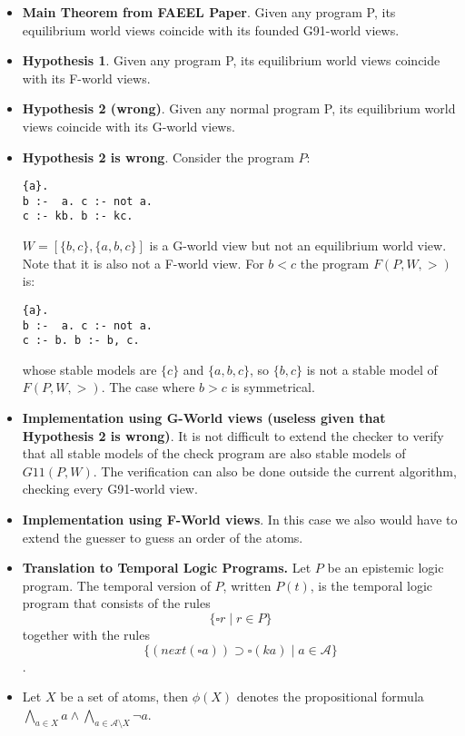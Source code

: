 \documentclass{article}
\begin{document}
\begin{itemize}
\item
\textbf{Main Theorem from FAEEL Paper}.
Given any program P, its equilibrium world views coincide
with its founded G91-world views.

\item
\textbf{Hypothesis 1}.
Given any program P, its equilibrium world views coincide
with its F-world views.

\item
\textbf{Hypothesis 2 (wrong)}.
Given any normal program P, its equilibrium world views coincide
with its G-world views.

\item
\textbf{Hypothesis 2 is wrong}.
Consider the program $P$:
\begin{verbatim}
{a}.
b :-  a. c :- not a.
c :- kb. b :- kc.
\end{verbatim}
$W=[\{b,c\},\{a,b,c\}]$ is a G-world view but not an
equilibrium world view.
%
Note that it is also not a F-world view. 
%
For $b < c$ the program $F(P,W,>)$ is:
\begin{verbatim}
{a}.
b :-  a. c :- not a.
c :- b. b :- b, c.
\end{verbatim}
whose stable models are $\{c\}$ and $\{a,b,c\}$, 
so $\{b,c\}$ is not a stable model of $F(P,W,>)$.
%
The case where $b > c$ is symmetrical.

\item
\textbf{Implementation using G-World views 
(useless given that Hypothesis 2 is wrong)}.
It is not difficult to extend the checker to 
verify that all stable models of the check program 
are also stable models of $G11(P,W)$.
%
The verification can also be done outside the current algorithm, 
checking every G91-world view. 

\item
\textbf{Implementation using F-World views}.
In this case we also would have to extend the 
guesser to guess an order of the atoms.

\item
\textbf{Translation to Temporal Logic Programs.}
%
Let $P$ be an epistemic logic program.
%
The temporal version of $P$, written $P(t)$, 
is the temporal logic program that consists of the rules
\[\{\square r \mid r \in P\}\] 
together with the rules
\[\{(next(\square a)) \supset \square(ka) \mid a \in \mathcal{A}\}\].

\item
Let $X$ be a set of atoms, then
$\phi(X)$ denotes the propositional formula $\bigwedge_{a \in X}a \wedge \bigwedge_{a \in \mathcal{A}\setminus X}\lnot a$. 


\end{itemize}
\end{document}

